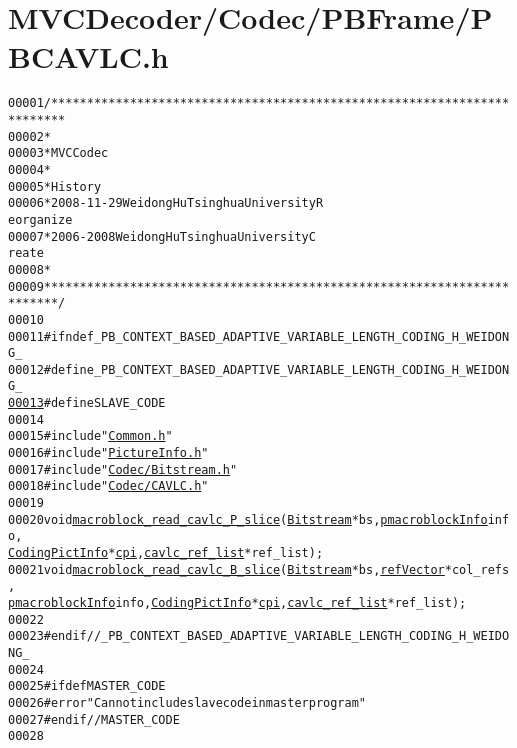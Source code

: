 \hypertarget{_p_b_c_a_v_l_c_8h_source}{
\section{MVCDecoder/Codec/PBFrame/PBCAVLC.h}
}


\begin{footnotesize}\begin{alltt}
00001 \textcolor{comment}{/************************************************************************}
00002 \textcolor{comment}{ *}
00003 \textcolor{comment}{ * MVC Codec}
00004 \textcolor{comment}{ * }
00005 \textcolor{comment}{ * History}
00006 \textcolor{comment}{ * 2008-11-29           Weidong Hu              Tsinghua University             R
      eorganize}
00007 \textcolor{comment}{ * 2006-2008            Weidong Hu              Tsinghua University             C
      reate}
00008 \textcolor{comment}{ * }
00009 \textcolor{comment}{ ************************************************************************/}
00010 
00011 \textcolor{preprocessor}{#ifndef \_PB\_CONTEXT\_BASED\_ADAPTIVE\_VARIABLE\_LENGTH\_CODING\_H\_WEIDONG\_}
00012 \textcolor{preprocessor}{}\textcolor{preprocessor}{#define \_PB\_CONTEXT\_BASED\_ADAPTIVE\_VARIABLE\_LENGTH\_CODING\_H\_WEIDONG\_}
\hypertarget{_p_b_c_a_v_l_c_8h_source_l00013}{}\hyperlink{_p_b_c_a_v_l_c_8h_a995f6a4907273b8d56b6543ab1a57d17}{00013} \textcolor{preprocessor}{}\textcolor{preprocessor}{#define SLAVE\_CODE}
00014 \textcolor{preprocessor}{}
00015 \textcolor{preprocessor}{#include "\hyperlink{_common_8h}{Common.h}"}
00016 \textcolor{preprocessor}{#include "\hyperlink{_picture_info_8h}{PictureInfo.h}"}
00017 \textcolor{preprocessor}{#include "\hyperlink{_bitstream_8h}{Codec/Bitstream.h}"}
00018 \textcolor{preprocessor}{#include "\hyperlink{_c_a_v_l_c_8h}{Codec/CAVLC.h}"}
00019 
00020 \textcolor{keywordtype}{void} \hyperlink{_p_b_c_a_v_l_c_8cpp_afe9c114999f137df97529d13c1e485bb}{macroblock_read_cavlc_P_slice}(\hyperlink{struct_bitstream}{Bitstream} *bs, \hyperlink{structmacroblock_info}{pmacroblockInfo} info, 
      \hyperlink{struct_coding_pict_info}{CodingPictInfo} *\hyperlink{structtag__macroblock__info_ae7a0c6b68c7cbc0ffb1a82799eb386ef}{cpi}, \hyperlink{structtag__cavlc__ref__list}{cavlc_ref_list} *ref\_list);
00021 \textcolor{keywordtype}{void} \hyperlink{_p_b_c_a_v_l_c_8cpp_a9d0d19143ae03ff45bcfbf2c9980b11b}{macroblock_read_cavlc_B_slice}(\hyperlink{struct_bitstream}{Bitstream} *bs, \hyperlink{structref_vector}{refVector} *col\_refs, 
      \hyperlink{structmacroblock_info}{pmacroblockInfo} info, \hyperlink{struct_coding_pict_info}{CodingPictInfo} *\hyperlink{structtag__macroblock__info_ae7a0c6b68c7cbc0ffb1a82799eb386ef}{cpi}, \hyperlink{structtag__cavlc__ref__list}{cavlc_ref_list} *ref\_list);
00022 
00023 \textcolor{preprocessor}{#endif //\_PB\_CONTEXT\_BASED\_ADAPTIVE\_VARIABLE\_LENGTH\_CODING\_H\_WEIDONG\_}
00024 \textcolor{preprocessor}{}
00025 \textcolor{preprocessor}{#ifdef MASTER\_CODE}
00026 \textcolor{preprocessor}{}\textcolor{preprocessor}{#error "Can not include slave code in master program"}
00027 \textcolor{preprocessor}{}\textcolor{preprocessor}{#endif // MASTER\_CODE}
00028 \textcolor{preprocessor}{}
\end{alltt}\end{footnotesize}
